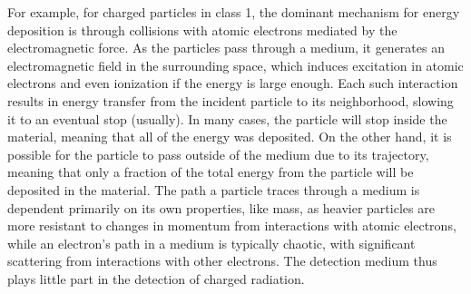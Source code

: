 For example, for charged particles in class 1, the dominant mechanism for energy deposition is through collisions with atomic electrons mediated by the electromagnetic force. As the particles pass through a medium, it generates an electromagnetic field in the surrounding space, which induces excitation in atomic electrons and even ionization if the energy is large enough. Each such interaction results in energy transfer from the incident particle to its neighborhood, slowing it to an eventual stop (usually). In many cases, the particle will stop inside the material, meaning that all of the energy was deposited. On the other hand, it is possible for the particle to pass outside of the medium due to its trajectory, meaning that only a fraction of the total energy from the particle will be deposited in the material. The path a particle traces through a medium is dependent primarily on its own properties, like mass, as heavier particles are more resistant to changes in momentum from interactions with atomic electrons, while an electron's path in a medium is typically chaotic, with significant scattering from interactions with other electrons. The detection medium thus plays little part in the detection of charged radiation.

